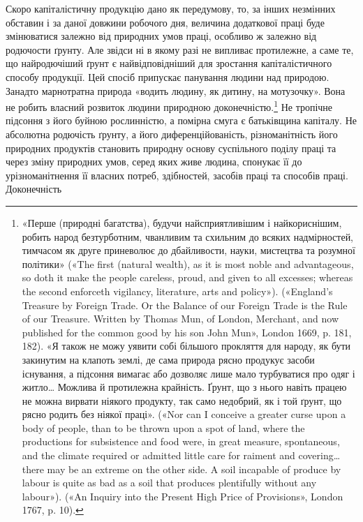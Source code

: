 Скоро капіталістичну продукцію дано як передумову, то, за
інших незмінних обставин і за даної довжини робочого дня, величина
додаткової праці буде змінюватися залежно від природних
умов праці, особливо ж залежно від родючости ґрунту. Але звідси
ні в якому разі не випливає протилежне, а саме те, що найродючіший
ґрунт є найвідповідніший для зростання капіталістичного
способу продукції. Цей спосіб припускає панування людини над
природою. Занадто марнотратна природа «водить людину, як
дитину, на мотузочку». Вона не робить власний розвиток людини
природною доконечністю.\footnote{
«Перше (природні багатства), будучи найсприятливішим і найкориснішим,
робить народ безтурботним, чванливим та схильним до всяких
надмірностей, тимчасом як друге приневолює до дбайливости, науки,
мистецтва та розумної політики» («The first (natural wealth), as it
is most noble and advantageous, so doth it make the people careless, proud,
and given to all excesses; whereas the second enforceth vigilancy, literature,
arts and policy»). («England’s Treasure by Foreign Trade. Or the Balance
of our Foreign Trade is the Rule of our Treasure. Written by Thomas Mun,
of London, Merchant, and now published for the common good by his son
John Mun», London 1669, p. 181, 182). «Я також не можу уявити собі
більшого прокляття для народу, як бути закинутим на клапоть землі,
де сама природа рясно продукує засоби існування, а підсоння вимагає
або дозволяє лише мало турбуватися про одяг і житло\dots{} Можлива й протилежна
крайність. Ґрунт, що з нього навіть працею не можна вирвати
ніякого продукту, так само недобрий, як і той ґрунт, що рясно родить
без ніякої праці». («Nor can I conceive a greater curse upon a body of people,
than to be thrown upon a spot of land, where the productions for subsistence
and food were, in great measure, spontaneous, and the climate required
or admitted little care for raiment and covering\dots{} there may be an extreme
on the other side. A soil incapable of produce by labour is quite as bad as
a soil that produces plentifully without any labour»). («An Inquiry into
the Present High Price of Provisions», London 1767, p. 10).
} Не тропічне підсоння з його буйною
рослинністю, а помірна смуга є батьківщина капіталу. Не абсолютна
родючість ґрунту, а його диференційованість, різноманітність
його природних продуктів становить природну основу
суспільного поділу праці та через зміну природних умов, серед
яких живе людина, спонукає її до урізноманітнення її власних
потреб, здібностей, засобів праці та способів праці. Доконечність
